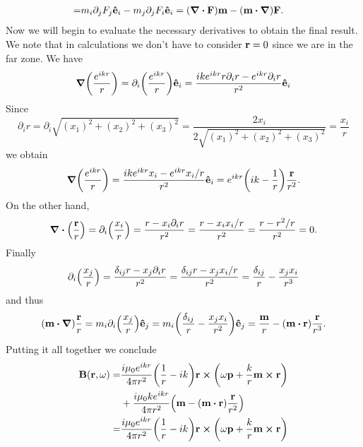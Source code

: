 \documentclass{article}
\begin{document}
\begin{enumerate}[(i)]
\begin{align}
\begin{split}
=&m_i\partial_jF_j\vu{e}_i-m_j\partial_jF_i\vu{e}_i=(\div{\vb{F}})\vb{m}-(\vb{m}\vdot\grad)\vb{F}.
\end{split}
\end{align}
Now we will begin to evaluate the necessary derivatives to obtain the final result. We note that in calculations we don't have to consider $\vb{r}=0$ since we are in the far zone. We have
\begin{equation}
\grad(\frac{e^{ikr}}{r})=\partial_i\qty(\frac{e^{ikr}}{r})\vu{e}_i=\frac{ike^{ikr}r\partial_ir-e^{ikr}\partial_ir}{r^2}\vu{e}_i
\end{equation}
Since
\begin{equation}
\partial_ir=\partial_i\sqrt{(x_1)^2+(x_2)^2+(x_3)^2}=\frac{2x_i}{2\sqrt{(x_1)^2+(x_2)^2+(x_3)^2}}=\frac{x_i}{r}
\end{equation}
we obtain
\begin{equation}\label{ec:other_gradient}
\grad(\frac{e^{ikr}}{r})=\frac{ike^{ikr}x_i-e^{ikr}x_i/r}{r^2}\vu{e}_i=e^{ikr}\qty(ik-\frac{1}{r})\frac{\vb{r}}{r^2}.
\end{equation}
On the other hand, 
\begin{equation}\label{ec:divergence}
\div(\frac{\vb{r}}{r})=\partial_i\qty(\frac{x_i}{r})=\frac{r-x_i\partial_ir}{r^2}=\frac{r-x_ix_i/r}{r^2}=\frac{r-r^2/r}{r^2}=0.
\end{equation}
Finally
\begin{equation}
\partial_i\qty(\frac{x_j}{r})=\frac{\delta_{ij}r-x_j\partial_ir}{r^2}=\frac{\delta_{ij}r-x_jx_i/r}{r^2}=\frac{\delta_{ij}}{r}-\frac{x_jx_i}{r^3}
\end{equation}
and thus
\begin{equation}\label{ec:weird_divergence}
(\vb{m}\vdot\grad)\frac{\vb{r}}{r}=m_i\partial_i\qty(\frac{x_j}{r})\vu{e}_j=m_i\qty(\frac{\delta_{ij}}{r}-\frac{x_jx_i}{r^2})\vu{e}_j=\frac{\vb{m}}{r}-(\vb{m}\vdot\vb{r})\frac{\vb{r}}{r^3}.
\end{equation}
Putting it all together we conclude
\begin{align}
\begin{split}
\vb{B}(\vb{r},\omega)=&\frac{i\mu_0e^{ikr}}{4\pi r^2}\qty(\frac{1}{r}-ik)\vb{r}\cross\qty(\omega\vb{p}+\frac{k}{r}\vb{m}\cross\vb{r})\\
&+\frac{i\mu_0ke^{ikr}}{4\pi r^2}\qty(\vb{m}-(\vb{m}\vdot\vb{r})\frac{\vb{r}}{r^2})\\
=&\frac{i\mu_0e^{ikr}}{4\pi r^2}\qty(\frac{1}{r}-ik)\vb{r}\cross\qty(\omega\vb{p}+\frac{k}{r}\vb{m}\cross\vb{r})\\

\end{split}
\end{align}
\end{enumerate}
\end{document}

